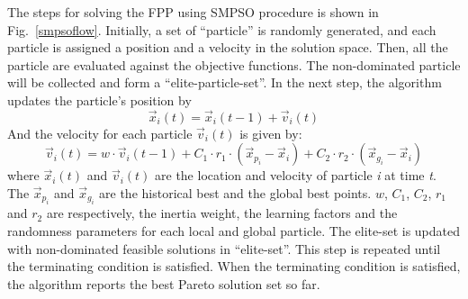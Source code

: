 \documentclass[10pt,journal,compsoc]{IEEEtran}
\newcommand{\Fig}[1]{Fig.~\ref{#1}}
\newcommand{\Eq}[1]{(\ref{#1})}
\begin{document}
The steps for solving the FPP using SMPSO procedure is shown in \Fig{smpsoflow}. Initially, a set of ``particle'' is randomly generated, and each particle is assigned a position and a velocity in the solution space. Then, all the particle are evaluated against the objective functions. The non-dominated particle will be collected and form a ``elite-particle-set''. In the next step, the algorithm updates the particle's position by
\begin{equation}\label{psoposition}
	\vec{x}_i(t) = \vec{x}_i(t-1) + \vec{v}_i(t)
\end{equation}
And the velocity for each particle $\vec{v}_i(t)$ is given by:
\begin{equation}\label{psospeed}
\vec{v}_i(t) = w \cdot \vec{v}_i(t-1) + C_1 \cdot r_1 \cdot (\vec{x}_{p_i}- \vec{x}_i)+ C_2 \cdot r_2 \cdot (\vec{x}_{g_i} - \vec{x}_i)
\end{equation}
where $\vec{x}_i(t)$ and $\vec{v}_i(t)$ are the location and velocity of particle \textit{i} at time \textit{t}. 
The $\vec{x}_{p_i}$ and $\vec{x}_{g_i}$ are the historical best and the global best points.
$w$, $C_1$, $C_2$, $r_1$ and $r_2 $ are respectively, the inertia weight, the learning factors and the randomness parameters for each local and global particle.
The elite-set is updated with non-dominated feasible solutions in ``elite-set''. This step is repeated until the terminating condition is satisfied. When the terminating condition is satisfied, the algorithm reports the best Pareto solution set so far.
%
\end{document}
